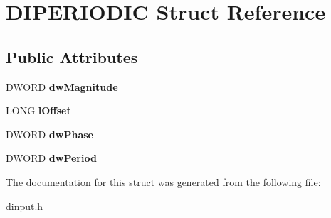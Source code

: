 \hypertarget{struct_d_i_p_e_r_i_o_d_i_c}{\section{D\-I\-P\-E\-R\-I\-O\-D\-I\-C Struct Reference}
\label{struct_d_i_p_e_r_i_o_d_i_c}
}
\subsection*{Public Attributes}
\begin{DoxyCompactItemize}
\item 
\hypertarget{struct_d_i_p_e_r_i_o_d_i_c_a7983538041ff12f62cfa55c3c9d9b48f}{D\-W\-O\-R\-D {\bfseries dw\-Magnitude}}\label{struct_d_i_p_e_r_i_o_d_i_c_a7983538041ff12f62cfa55c3c9d9b48f}

\item 
\hypertarget{struct_d_i_p_e_r_i_o_d_i_c_a5aa8b72b52f798f0ad20a8ca6453f42f}{L\-O\-N\-G {\bfseries l\-Offset}}\label{struct_d_i_p_e_r_i_o_d_i_c_a5aa8b72b52f798f0ad20a8ca6453f42f}

\item 
\hypertarget{struct_d_i_p_e_r_i_o_d_i_c_aa186cb86456c371da401b045e0ece6eb}{D\-W\-O\-R\-D {\bfseries dw\-Phase}}\label{struct_d_i_p_e_r_i_o_d_i_c_aa186cb86456c371da401b045e0ece6eb}

\item 
\hypertarget{struct_d_i_p_e_r_i_o_d_i_c_a00905481e88554ee2f600c26f4cdee05}{D\-W\-O\-R\-D {\bfseries dw\-Period}}\label{struct_d_i_p_e_r_i_o_d_i_c_a00905481e88554ee2f600c26f4cdee05}

\end{DoxyCompactItemize}


The documentation for this struct was generated from the following file\-:\begin{DoxyCompactItemize}
\item 
dinput.\-h\end{DoxyCompactItemize}
